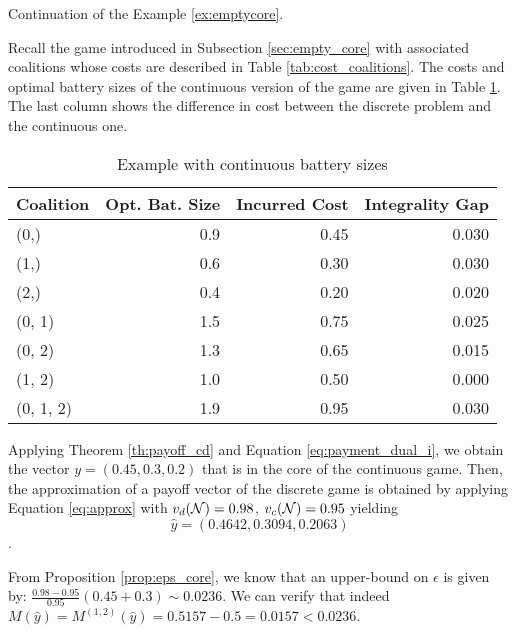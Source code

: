 \begin{example} Continuation of the Example \ref{ex:emptycore}.

Recall the game introduced in Subsection \ref{sec:empty_core} with associated coalitions whose costs are described in Table \ref{tab:cost_coalitions}. The costs and optimal battery sizes of the continuous version of the game are given in Table \ref{tab:cost_coal_cont}. The last column shows the difference in cost between the discrete problem and the continuous one.

\begin{table}
  \caption{Example with continuous battery sizes}
  \label{tab:cost_coal_cont}
\begin{tabular}{lrrr}
\toprule
 Coalition &  Opt. Bat. Size &  Incurred Cost &  Integrality Gap \\
\midrule
      (0,) &                   0.9 &           0.45 &            0.030 \\
      (1,) &                   0.6 &           0.30 &            0.030 \\
      (2,) &                   0.4 &           0.20 &            0.020 \\
    (0, 1) &                   1.5 &           0.75 &            0.025 \\
    (0, 2) &                   1.3 &           0.65 &            0.015 \\
    (1, 2) &                   1.0 &           0.50 &            0.000 \\
 (0, 1, 2) &                   1.9 &           0.95 &            0.030 \\
\bottomrule
\end{tabular}
\end{table}

Applying Theorem \ref{th:payoff_cd} and Equation \eqref{eq:payment_dual_i}, we obtain the vector $y = (0.45, 0.3, 0.2)$ that is in the core of the continuous game. Then, the approximation of a payoff vector of the discrete game is obtained by applying Equation \eqref{eq:approx} with $v_d(\mathcal{N}) = 0.98$, $v_c(\mathcal{N}) = 0.95$ yielding $$\hat{y} = (0.4642, 0.3094, 0.2063)$$.

From Proposition \ref{prop:eps_core}, we know that an upper-bound on $\epsilon$ is given by: $\frac{0.98 - 0.95}{0.95} \left( 0.45 + 0.3 \right) \sim 0.0236$. We can verify that indeed $M(\hat{y}) = M^{(1, 2)}(\hat{y}) = 0.5157 - 0.5 =  0.0157 < 0.0236$.


\end{example}

